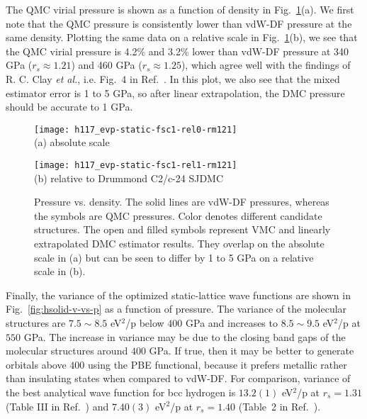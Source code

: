 The QMC virial pressure is shown as a function of density in Fig.~\ref{fig:hsolid-p-vs-n}(a).
We first note that the QMC pressure is consistently lower than vdW-DF pressure at the same density.
Plotting the same data on a relative scale in Fig.~\ref{fig:hsolid-p-vs-n}(b),
we see that the QMC virial pressure is 4.2\% and 3.2\% lower than vdW-DF pressure at 340 GPa ($r_s\approx 1.21$) and 460 GPa ($r_s\approx 1.25$), which agree well with the findings of R. C. Clay \textit{et al.}, i.e. Fig.~4 in Ref.~\cite{Clay2016}.
In this plot, we also see that the mixed estimator error is 1 to 5 GPa, so after linear extrapolation, the DMC pressure should be accurate to 1 GPa.

\begin{figure}[h]
\centering
\begin{minipage}{0.49\textwidth}
\centering
\texttt{[image: h117\_evp-static-fsc1-rel0-rm121]}\\
(a) absolute scale
\end{minipage}
\begin{minipage}{0.49\textwidth}
\centering
\texttt{[image: h117\_evp-static-fsc1-rel1-rm121]}\\
(b) relative to Drummond C2/c-24 SJDMC
\end{minipage}
\caption{Pressure vs. density. The solid lines are vdW-DF pressures, whereas the symbols are QMC pressures. Color denotes different candidate structures. The open and filled symbols represent VMC and linearly extrapolated DMC estimator results. They overlap on the absolute scale in (a) but can be seen to differ by 1 to 5 GPa on a relative scale in (b).}
\label{fig:hsolid-p-vs-n}
\end{figure}

Finally, the variance of the optimized static-lattice wave functions are shown in Fig.~\ref{fig:hsolid-v-vs-p} as a function of pressure.
The variance of the molecular structures are $7.5\sim8.5$ eV$^2$/p below $400$ GPa and increases to $8.5\sim9.5$ eV$^2$/p at $550$ GPa.
The increase in variance may be due to the closing band gaps of the molecular structures around $400$ GPa.
If true, then it may be better to generate orbitals above $400$ using the PBE functional, because it prefers metallic rather than insulating states when compared to vdW-DF.
For comparison, variance of the best analytical wave function for bcc hydrogen is $13.2(1)$ eV$^2$/p at $r_s=1.31$ (Table III in Ref.~\cite{Holzmann2003}) and $7.40(3)$ eV$^2$/p at $r_s=1.40$ (Table~2 in Ref.~\cite{Pierleoni2008}).


